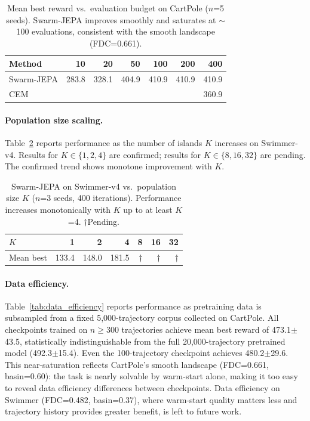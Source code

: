 \begin{table}[t]
\centering
\caption{Mean best reward vs.\ evaluation budget on CartPole
($n$=5 seeds). Swarm-JEPA improves smoothly and saturates at
$\sim$100 evaluations, consistent with the smooth landscape
(FDC=0.661). }
\label{tab:budget_scaling}
\begin{tabular}{lrrrrrr}
\toprule
Method & 10 & 20 & 50 & 100 & 200 & 400 \\
\midrule
Swarm-JEPA & 283.8 & 328.1 & 404.9 & 410.9 & 410.9 & 410.9 \\
CEM        & \todo{} & \todo{} & \todo{} & \todo{} & \todo{} & 360.9 \\
\bottomrule
\end{tabular}
\end{table}

\paragraph{Population size scaling.}
Table~\ref{tab:population_scaling} reports performance as the number
of islands $K$ increases on Swimmer-v4.
Results for $K \in \{1,2,4\}$ are confirmed; results for
$K \in \{8,16,32\}$ are pending.
The confirmed trend shows monotone improvement with $K$.

\begin{table}[t]
\centering
\caption{Swarm-JEPA on Swimmer-v4 vs.\ population size $K$
($n$=3 seeds, 400 iterations).
Performance increases monotonically with $K$ up to at least $K$=4.
$\dagger$Pending.}
\label{tab:population_scaling}
\begin{tabular}{lrrrrrr}
\toprule
$K$ & 1 & 2 & 4 & 8 & 16 & 32 \\
\midrule
Mean best & 133.4 & 148.0 & 181.5
  & \todo{}$\dagger$ & \todo{}$\dagger$ & \todo{}$\dagger$ \\
\bottomrule
\end{tabular}
\end{table}

\paragraph{Data efficiency.}
Table~\ref{tab:data_efficiency} reports performance as pretraining
data is subsampled from a fixed 5{,}000-trajectory corpus collected
on CartPole.
All checkpoints trained on $n \geq 300$ trajectories achieve
mean best reward of 473.1$\pm$43.5, statistically indistinguishable
from the full 20{,}000-trajectory pretrained model (492.3$\pm$15.4).
Even the 100-trajectory checkpoint achieves 480.2$\pm$29.6.
This near-saturation reflects CartPole's smooth landscape
(FDC=0.661, basin=0.60): the task is nearly solvable by warm-start
alone, making it too easy to reveal data efficiency differences
between checkpoints.
Data efficiency on Swimmer (FDC=0.482, basin=0.37), where
warm-start quality matters less and trajectory history provides
greater benefit, is left to future work.


